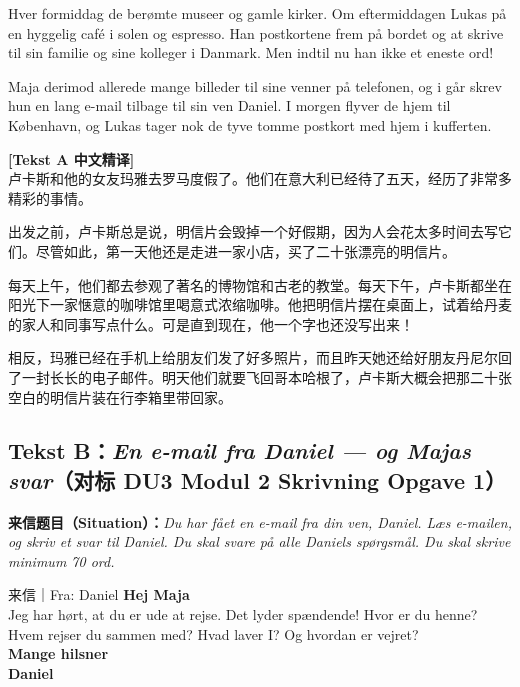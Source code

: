 Hver formiddag  de  berømte museer og gamle kirker. Om eftermiddagen  Lukas  på en hyggelig café i solen og  espresso. Han  postkortene frem på bordet og  at skrive til sin familie og sine kolleger i Danmark. Men indtil nu  han ikke  et eneste ord!

Maja  derimod allerede  mange billeder til sine venner på telefonen, og i går skrev hun en lang e-mail tilbage til sin ven Daniel. I morgen flyver de hjem til København, og Lukas tager nok de tyve tomme postkort med hjem i kufferten.

\begin{tcolorbox}[colback=NCDBgGray, colframe=NCDGray!40, boxrule=0.5pt, arc=2pt, breakable]
\small
\textbf{\color{NCDTeal}[Tekst A 中文精译]}\\
卢卡斯和他的女友玛雅去罗马度假了。他们在意大利已经待了五天，经历了非常多精彩的事情。

出发之前，卢卡斯总是说，明信片会毁掉一个好假期，因为人会花太多时间去写它们。尽管如此，第一天他还是走进一家小店，买了二十张漂亮的明信片。

每天上午，他们都去参观了著名的博物馆和古老的教堂。每天下午，卢卡斯都坐在阳光下一家惬意的咖啡馆里喝意式浓缩咖啡。他把明信片摆在桌面上，试着给丹麦的家人和同事写点什么。可是直到现在，他一个字也还没写出来！

相反，玛雅已经在手机上给朋友们发了好多照片，而且昨天她还给好朋友丹尼尔回了一封长长的电子邮件。明天他们就要飞回哥本哈根了，卢卡斯大概会把那二十张空白的明信片装在行李箱里带回家。
\end{tcolorbox}

\subsection*{Tekst B：\textit{En e-mail fra Daniel --- og Majas svar}（对标 DU3 Modul 2 Skrivning Opgave 1）}

\textbf{来信题目（Situation）：}\textit{Du har fået en e-mail fra din ven, Daniel. Læs e-mailen, og skriv et svar til Daniel. Du skal svare på alle Daniels spørgsmål. Du skal skrive minimum 70 ord.}

\begin{emailbox}{来信｜Fra: Daniel}
\textbf{Hej Maja}\\
Jeg har hørt, at du er ude at rejse. Det lyder spændende! Hvor er du henne? Hvem rejser du sammen med? Hvad laver I? Og hvordan er vejret?\\
\textbf{Mange hilsner}\\
\textbf{Daniel}
\end{emailbox}

